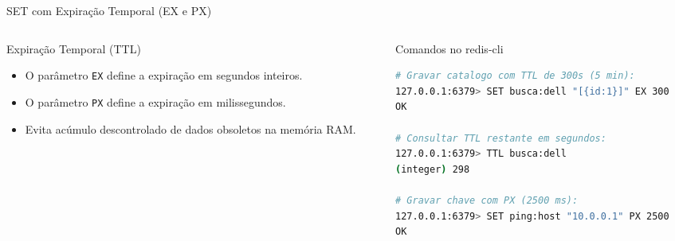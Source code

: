 \begin{frame}[fragile]{SET com Expiração Temporal (EX e PX)}
  \begin{columns}[T]
    \begin{column}{0.48\textwidth}
      \alert{Expiração Temporal (TTL)}\par
      \small
      \begin{itemize}
        \item O parâmetro \texttt{EX} define a expiração em segundos inteiros.
        \item O parâmetro \texttt{PX} define a expiração em milissegundos.
        \item Evita acúmulo descontrolado de dados obsoletos na memória RAM.
      \end{itemize}
    \end{column}
    \begin{column}{0.50\textwidth}
      \alert{Comandos no redis-cli}\par
      \begin{lstlisting}[language=bash]
# Gravar catalogo com TTL de 300s (5 min):
127.0.0.1:6379> SET busca:dell "[{id:1}]" EX 300
OK

# Consultar TTL restante em segundos:
127.0.0.1:6379> TTL busca:dell
(integer) 298

# Gravar chave com PX (2500 ms):
127.0.0.1:6379> SET ping:host "10.0.0.1" PX 2500
OK
      \end{lstlisting}
    \end{column}
  \end{columns}
\end{frame}


